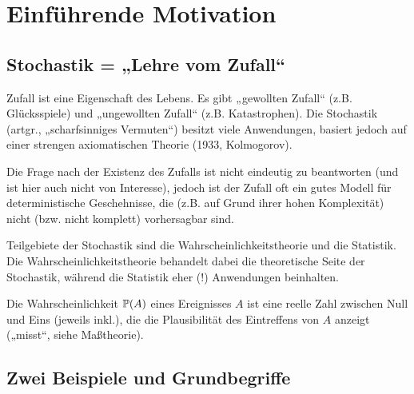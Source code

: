 \chapter{Einführende Motivation}


\section{Stochastik = „Lehre vom Zufall“}


Zufall ist eine Eigenschaft des Lebens.
Es gibt „gewollten Zufall“ (z.B. Glücksspiele) und „ungewollten Zufall“ (z.B. Katastrophen).
Die Stochastik (artgr., „scharfsinniges Vermuten“) besitzt viele Anwendungen, basiert jedoch auf einer strengen axiomatischen Theorie (1933, Kolmogorov).

Die Frage nach der Existenz des Zufalls ist nicht eindeutig zu beantworten (und ist hier auch nicht von Interesse), jedoch ist der Zufall oft ein gutes Modell für deterministische Geschehnisse, die (z.B. auf Grund ihrer hohen Komplexität) nicht (bzw. nicht komplett) vorhersagbar sind.

Teilgebiete der Stochastik sind die Wahrscheinlichkeitstheorie und die Statistik.
Die Wahrscheinlichkeitstheorie behandelt dabei die theoretische Seite der Stochastik, während die Statistik eher (!) Anwendungen beinhalten.

Die Wahrscheinlichkeit $\P(A)$ eines Ereignisses $A$ ist eine reelle Zahl zwischen Null und Eins (jeweils inkl.), die die Plausibilität des Eintreffens von $A$ anzeigt („misst“, siehe Maßtheorie).


\section{Zwei Beispiele und Grundbegriffe}

